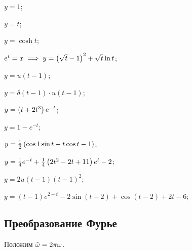 \begin{enumsols}
		\item \( y = 1 \); \sfill %
		\item \( y = t \); \sfill %
		\item \( y = \cosh{t} \); \sfill %
		\item \( e^t = x \implies y = \left( \sqrt{t} - 1 \right)^2 + \sqrt{t} \ln{t} \); \sfill %

		\item \( y = u(t-1) \); \sfill %
		\item \( y = \delta(t-1) \cdot u(t-1) \); \sfill %
		\item \( y = \left( t + 2t^3 \right) e^{-t} \); \sfill %
		\item \( y = 1 - e^{-t} \); \sfill %
		\item \( y = \frac{1}{2} \left(  \cos{1}\sin{t} - t \cos{t-1}  \right) \); \sfill %
		\item \( y = \frac{1}{4} e^{-t} + \frac{1}{4} \left( 2t^2 - 2t + 11 \right) e^t - 2 \); \sfill %
		\item \( y = 2 u(t-1) (t-1)^2 \); \sfill %
		\item \( y = (t-1) e^{2-t} - 2 \sin(t-2) + \cos(t-2) + 2t - 6 \); \sfill %

	\end{enumsols}

\subsection*{Преобразование Фурье}
	
	Положим \( \hat{\omega} = 2 \pi \omega \).

